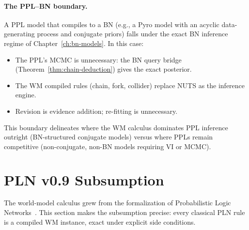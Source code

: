 \paragraph{The PPL--BN boundary.}
A PPL model that compiles to a BN (e.g., a Pyro model with an acyclic
data-generating process and conjugate priors) falls under the exact BN
inference regime of Chapter~\ref{ch:bn-models}.  In this case:
\begin{itemize}
\item The PPL's MCMC is unnecessary: the BN query bridge
  (Theorem~\ref{thm:chain-deduction}) gives the exact posterior.
\item The WM compiled rules (chain, fork, collider) replace NUTS
  as the inference engine.
\item Revision is evidence addition; re-fitting is unnecessary.
\end{itemize}
This boundary delineates where the WM calculus dominates PPL inference
outright (BN-structured conjugate models) versus where PPLs remain
competitive (non-conjugate, non-BN models requiring VI or MCMC).



\section{PLN v0.9 Subsumption}
\label{sec:bridge-pln}

The world-model calculus grew from the formalization of Probabilistic
Logic Networks~\cite{goertzel2009pln}.  This section makes the
subsumption precise: every classical PLN rule is a compiled WM
instance, exact under explicit side conditions.

